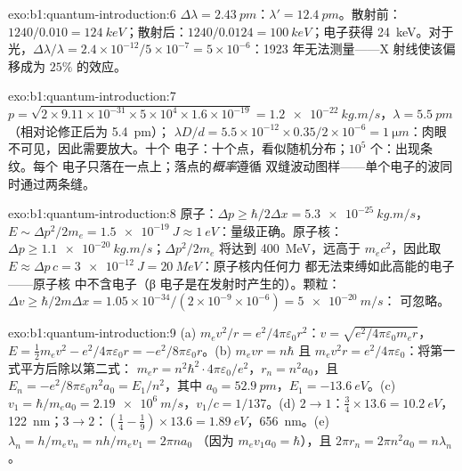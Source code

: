 \begin{solution}{exo:b1:quantum-introduction:6}
$\Delta\lambda = \qty{2.43}{pm}$：$\lambda' = \qty{12.4}{pm}$。散射前：$1240/0.010 =
\qty{124}{keV}$；散射后：$1240/0.0124 = \qty{100}{keV}$；电子获得
\qty{24}{keV}。对于光，$\Delta\lambda/\lambda = 2.4 \times 10^{-12}/5 \times 10^{-7} = 5 \times
10^{-6}$：1923 年无法测量——X 射线使该偏移成为 $25\%$ 的效应。
\end{solution}

\begin{solution}{exo:b1:quantum-introduction:7}
$p = \sqrt{2 \times 9.11 \times 10^{-31} \times 5 \times 10^4 \times 1.6 \times 10^{-19}} =
\qty{1.2e-22}{kg.m/s}$，$\lambda = \qty{5.5}{pm}$（相对论修正后为
\qty{5.4}{pm}）； $\lambda D/d = 5.5 \times 10^{-12} \times 0.35/2 \times 10^{-6}
= \qty{1}{\micro m}$：肉眼不可见，因此需要放大。十个
电子：十个点，看似随机分布；$10^5$ 个：出现条纹。每个
电子只落在一点上；落点的\emph{概率}遵循
双缝波动图样——单个电子的波同时通过两条缝。
\end{solution}

\begin{solution}{exo:b1:quantum-introduction:8}
原子：$\Delta p \geq \hbar/2\Delta x = \qty{5.3e-25}{kg.m/s}$，$E \sim \Delta p^2/2m_e =
\qty{1.5e-19}{J} \approx \qty{1}{eV}$：量级正确。原子核：$\Delta p \geq
\qty{1.1e-20}{kg.m/s}$；$\Delta p^2/2m_e$ 将达到 \qty{400}{MeV}，远高于
$m_ec^2$，因此取 $E \approx \Delta p\,c = \qty{3e-12}{J} = \qty{20}{MeV}$：原子核内任何力
都无法束缚如此高能的电子——原子核
中不含电子（β 电子是在发射时产生的）。颗粒：$\Delta v \geq
\hbar/2m\Delta x = 1.05 \times 10^{-34}/(2 \times 10^{-9} \times 10^{-6}) = \qty{5e-20}{m/s}$：
可忽略。
\end{solution}

\begin{solution}{exo:b1:quantum-introduction:9}
(a) $m_ev^2/r = e^2/4\pi\varepsilon_0r^2$：$v = \sqrt{e^2/4\pi\varepsilon_0m_er}$，$E =
\tfrac12m_ev^2 - e^2/4\pi\varepsilon_0r = -e^2/8\pi\varepsilon_0r$。(b) $m_evr = n\hbar$ 且
$m_ev^2r = e^2/4\pi\varepsilon_0$：将第一式平方后除以第二式：
$m_er = n^2\hbar^2 \cdot 4\pi\varepsilon_0/e^2$，$r_n = n^2a_0$，且 $E_n = -e^2/8\pi\varepsilon_0n^2a_0
= E_1/n^2$，其中 $a_0 = \qty{52.9}{pm}$，$E_1 = \qty{-13.6}{eV}$。(c) $v_1 =
\hbar/m_ea_0 = \qty{2.19e6}{m/s}$，$v_1/c = 1/137$。(d) $2 \to 1$：$\tfrac34 \times
13.6 = \qty{10.2}{eV}$，\qty{122}{nm}；$3 \to 2$：$(\tfrac14 - \tfrac19) \times 13.6 =
\qty{1.89}{eV}$，\qty{656}{nm}。(e) $\lambda_n = h/m_ev_n = nh/m_ev_1 = 2\pi na_0$
（因为 $m_ev_1a_0 = \hbar$），且 $2\pi r_n = 2\pi n^2a_0 = n\lambda_n$。
\end{solution}

